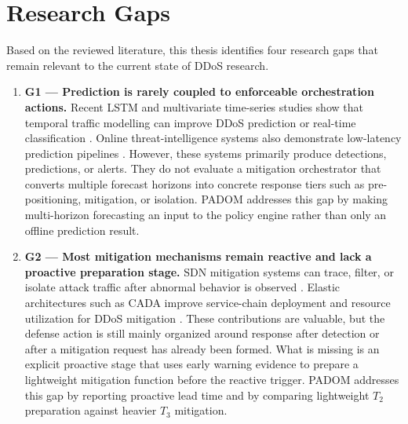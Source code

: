 \documentclass[12pt, a4paper, reqno, oneside]{book}
\newcommand{\padonap}{\textsc{PADOM}}
\newcommand{\tier}[1]{$T_{#1}$}
\begin{document}
\section{Research Gaps}
\label{sec:gaps}

Based on the reviewed literature, this thesis identifies four research gaps
that remain relevant to the current state of DDoS research.

\begin{enumerate}
    \item \textbf{G1 --- Prediction is rarely coupled to enforceable
    orchestration actions.}
    Recent LSTM and multivariate time-series studies show that temporal
    traffic modelling can improve DDoS prediction or real-time classification
    \cite{kumar2025multivariate,hernandez2025realtime_timeseries}. Online
    threat-intelligence systems also demonstrate low-latency prediction
    pipelines \cite{thaqi2026online_threat_intel}. However, these systems
    primarily produce detections, predictions, or alerts. They do not evaluate
    a mitigation orchestrator that converts multiple forecast horizons into
    concrete response tiers such as pre-positioning, mitigation, or isolation.
    \padonap{} addresses this gap by making multi-horizon forecasting an input
    to the policy engine rather than only an offline prediction result.

    \item \textbf{G2 --- Most mitigation mechanisms remain reactive and lack a
    proactive preparation stage.}
    SDN mitigation systems can trace, filter, or isolate attack traffic after
    abnormal behavior is observed \cite{wang2024multidimensional_sdn}. Elastic
    architectures such as CADA improve service-chain deployment and resource
    utilization for DDoS mitigation \cite{cada_2025}. These contributions are
    valuable, but the defense action is still mainly organized around response
    after detection or after a mitigation request has already been formed. What
    is missing is an explicit proactive stage that uses early warning evidence
    to prepare a lightweight mitigation function before the reactive trigger.
    \padonap{} addresses this gap by reporting proactive lead time and by
    comparing lightweight \tier{2} preparation against heavier \tier{3}
    mitigation.


\end{enumerate}
\end{document}

